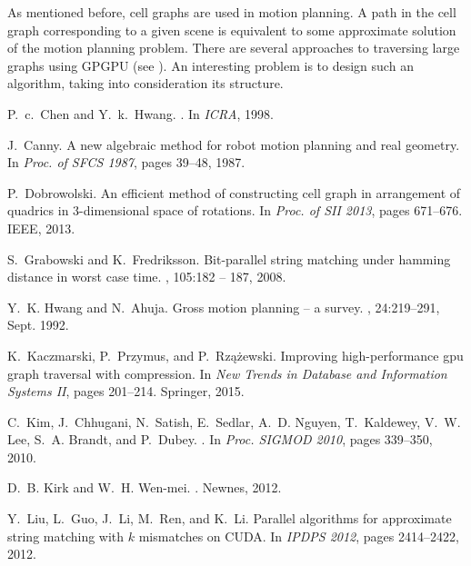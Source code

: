 \documentclass[a4paper]{article}
\begin{document}
As mentioned before, cell graphs are used in motion planning. A path in the cell graph corresponding to a given scene is equivalent to some approximate solution of the motion planning problem.
There are several approaches to traversing large graphs using GPGPU (see \cite{conf/ppopp/MerrillGG12,kaczmarski2015improving}). An interesting problem is to design such an algorithm, taking into consideration its structure.




\begin{thebibliography}{10}

P.~c.~Chen and Y.~k.~Hwang.
.
\newblock In {\em ICRA}, 1998.

J.~Canny.
\newblock A new algebraic method for robot motion planning and real geometry.
\newblock In {\em Proc. of SFCS 1987}, pages 39--48, 1987.

P.~Dobrowolski.
\newblock An efficient method of constructing cell graph in arrangement of
  quadrics in 3-dimensional space of rotations.
\newblock In {\em Proc. of {SII} 2013}, pages 671--676. {IEEE}, 2013.

S.~Grabowski and K.~Fredriksson.
\newblock Bit-parallel string matching under hamming distance in worst case
  time.
, 105:182 -- 187, 2008.

Y.~K. Hwang and N.~Ahuja.
\newblock Gross motion planning -- a survey.
, 24:219--291, Sept. 1992.

K.~Kaczmarski, P.~Przymus, and P.~Rz{\k{a}}{\.z}ewski.
\newblock Improving high-performance gpu graph traversal with compression.
\newblock In {\em New Trends in Database and Information Systems II}, pages
  201--214. Springer, 2015.

C.~Kim, J.~Chhugani, N.~Satish, E.~Sedlar, A.~D. Nguyen, T.~Kaldewey, V.~W.
  Lee, S.~A. Brandt, and P.~Dubey.
.
\newblock In {\em Proc. SIGMOD 2010}, pages 339--350, 2010.

D.~B. Kirk and W.~H. Wen-mei.
.
\newblock Newnes, 2012.

Y.~Liu, L.~Guo, J.~Li, M.~Ren, and K.~Li.
\newblock Parallel algorithms for approximate string matching with $k$
  mismatches on {CUDA}.
\newblock In {\em {IPDPS} 2012}, pages 2414--2422, 2012.


\end{thebibliography}
\end{document}
